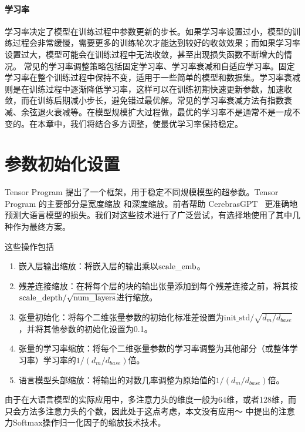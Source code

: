 \paragraph{学习率}
学习率决定了模型在训练过程中参数更新的步长。如果学习率设置过小，模型的训练过程会非常缓慢，需要更多的训练轮次才能达到较好的收敛效果；而如果学习率设置过大，模型可能会在训练过程中无法收敛，甚至出现损失函数不断增大的情况。
常见的学习率调整策略包括固定学习率、学习率衰减和自适应学习率。固定学习率在整个训练过程中保持不变，适用于一些简单的模型和数据集。学习率衰减则是在训练过程中逐渐降低学习率，这样可以在训练初期快速更新参数，加速收敛，而在训练后期减小步长，避免错过最优解。常见的学习率衰减方法有指数衰减、余弦退火衰减等。在模型规模扩大过程做，最优的学习率不是通常不是一成不变的。在本章中，我们将结合多方调整，使最优学习率保持稳定。


\section {参数初始化设置}
Tensor Program\citep{yang2022tensor, yang2023tensor} 提出了一个框架，用于稳定不同规模模型的超参数。Tensor Program 的主要部分是宽度缩放\citep{yang2022tensor} 和深度缩放\citep{yang2023tensor}。前者帮助 CerebrasGPT~\citep{dey2023cerebras} 更准确地预测大语言模型的损失。我们对这些技术进行了广泛尝试，有选择地使用了其中几种作为最终方案。

这些操作包括
\begin{enumerate}
  \item 嵌入层输出缩放：将嵌入层的输出乘以$\text{scale\_\text{emb}}$。
  \item 残差连接缩放：在将每个层的块的输出张量添加到每个残差连接之前，将其按$\text{scale\_\text{depth}}/\sqrt{\text{num\_layers}}$进行缩放。
  \item 张量初始化：将每个二维张量参数的初始化标准差设置为$\text{init\_std}/\sqrt{d_m/d_{base}}$，并将其他参数的初始化设置为0.1。
  \item 张量的学习率缩放：将每个二维张量参数的学习率调整为其他部分（或整体学习率）学习率的$1/({d_m/d_{base}})$倍。
  \item 语言模型头部缩放：将输出的对数几率调整为原始值的$1/(d_m/d_{base})$倍。
\end{enumerate}

由于在大语言模型的实际应用中，多注意力头的维度一般为64维，或者128维，而只会方法多注意力头的个数，因此处于这点考虑，本文没有应用～\citep{yang2022tensor} 中提出的注意力Softmax操作归一化因子的缩放技术技术。

